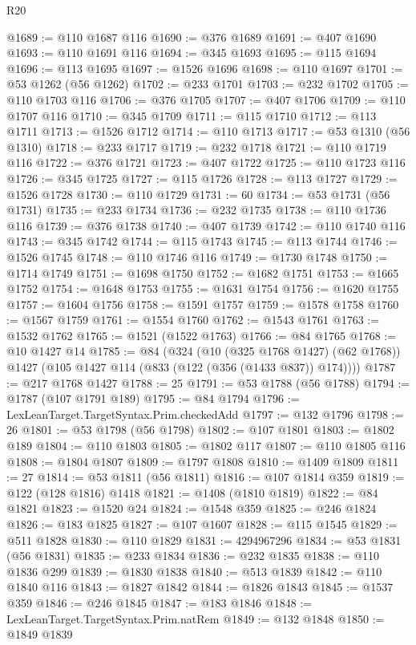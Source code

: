 \begin{lexlean}{R20}
\begin{coremodule}
@1689 := @110 @1687 @116
@1690 := @376 @1689
@1691 := @407 @1690
@1693 := @110 @1691 @116
@1694 := @345 @1693
@1695 := @115 @1694
@1696 := @113 @1695
@1697 := @1526 @1696
@1698 := @110 @1697
@1701 := @53 @1262 (@56 @1262)
@1702 := @233 @1701
@1703 := @232 @1702
@1705 := @110 @1703 @116
@1706 := @376 @1705
@1707 := @407 @1706
@1709 := @110 @1707 @116
@1710 := @345 @1709
@1711 := @115 @1710
@1712 := @113 @1711
@1713 := @1526 @1712
@1714 := @110 @1713
@1717 := @53 @1310 (@56 @1310)
@1718 := @233 @1717
@1719 := @232 @1718
@1721 := @110 @1719 @116
@1722 := @376 @1721
@1723 := @407 @1722
@1725 := @110 @1723 @116
@1726 := @345 @1725
@1727 := @115 @1726
@1728 := @113 @1727
@1729 := @1526 @1728
@1730 := @110 @1729
@1731 := 60
@1734 := @53 @1731 (@56 @1731)
@1735 := @233 @1734
@1736 := @232 @1735
@1738 := @110 @1736 @116
@1739 := @376 @1738
@1740 := @407 @1739
@1742 := @110 @1740 @116
@1743 := @345 @1742
@1744 := @115 @1743
@1745 := @113 @1744
@1746 := @1526 @1745
@1748 := @110 @1746 @116
@1749 := @1730 @1748
@1750 := @1714 @1749
@1751 := @1698 @1750
@1752 := @1682 @1751
@1753 := @1665 @1752
@1754 := @1648 @1753
@1755 := @1631 @1754
@1756 := @1620 @1755
@1757 := @1604 @1756
@1758 := @1591 @1757
@1759 := @1578 @1758
@1760 := @1567 @1759
@1761 := @1554 @1760
@1762 := @1543 @1761
@1763 := @1532 @1762
@1765 := @1521 (@1522 @1763)
@1766 := @84 @1765
@1768 := @10 @1427 @14
@1785 := @84
    (@324
      (@10 (@325 @1768 @1427) (@62 @1768))
      @1427
      (@105 @1427 @114 (@833 (@122 (@356 (@1433 @837)) @174))))
@1787 := @217 @1768 @1427
@1788 := 25
@1791 := @53 @1788 (@56 @1788)
@1794 := @1787 (@107 @1791 @189)
@1795 := @84 @1794
@1796 := LexLeanTarget.TargetSyntax.Prim.checkedAdd
@1797 := @132 @1796
@1798 := 26
@1801 := @53 @1798 (@56 @1798)
@1802 := @107 @1801
@1803 := @1802 @189
@1804 := @110 @1803
@1805 := @1802 @117
@1807 := @110 @1805 @116
@1808 := @1804 @1807
@1809 := @1797 @1808
@1810 := @1409 @1809
@1811 := 27
@1814 := @53 @1811 (@56 @1811)
@1816 := @107 @1814 @359
@1819 := @122 (@128 @1816) @1418
@1821 := @1408 (@1810 @1819)
@1822 := @84 @1821
@1823 := @1520 @24
@1824 := @1548 @359
@1825 := @246 @1824
@1826 := @183 @1825
@1827 := @107 @1607
@1828 := @115 @1545
@1829 := @511 @1828
@1830 := @110 @1829
@1831 := 4294967296
@1834 := @53 @1831 (@56 @1831)
@1835 := @233 @1834
@1836 := @232 @1835
@1838 := @110 @1836 @299
@1839 := @1830 @1838
@1840 := @513 @1839
@1842 := @110 @1840 @116
@1843 := @1827 @1842
@1844 := @1826 @1843
@1845 := @1537 @359
@1846 := @246 @1845
@1847 := @183 @1846
@1848 := LexLeanTarget.TargetSyntax.Prim.natRem
@1849 := @132 @1848
@1850 := @1849 @1839

\end{coremodule}
\end{lexlean}
